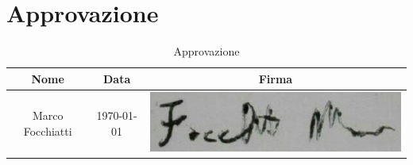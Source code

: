 \documentclass[./PianodiProgetto.tex]{subfiles}
\begin{document}
\section{Approvazione}
\begin{table}[H]
	\centering
	\begin{tabular}{|c|c|c|}
		\hline
		Nome&Data&Firma \\ \hline
		Marco Focchiatti& \today & \includegraphics[scale=0.5]{img/firme/FocchiattiMarco} \\
		\hline
	\end{tabular}
	\caption{Approvazione}
\end{table}
\end{document}
